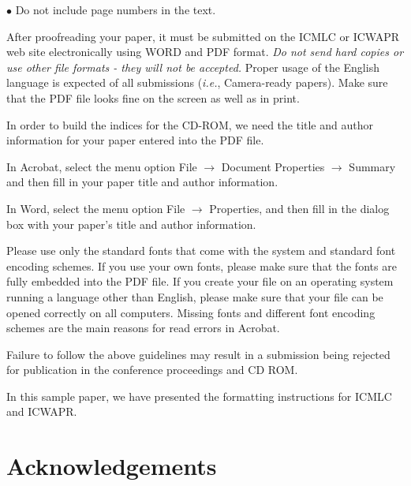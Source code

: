 \documentclass[a4paper, times, 10pt,twocolumn]{article}
\begin{document}
 \hspace{-3ex}    $\bullet$ \hspace{1ex} Do not include page numbers in the text.



After proofreading your paper, it must be submitted on the ICMLC or ICWAPR web site electronically using WORD and PDF format.
{\it Do not send hard copies or use other file formats - they will
not be accepted.} Proper usage of the English language is expected
of all submissions (\textit{i.e.}, Camera-ready papers). Make sure that the
PDF file looks fine on the screen as well as in print.

In order to build the indices for the CD-ROM, we need the title and
author information for your paper entered into the PDF file.

In Acrobat, select the menu option File $\longrightarrow$ Document
Properties $\longrightarrow$ Summary and then fill in your paper
title and author information.

In Word, select the menu option File $\longrightarrow$ Properties,
and then fill in the dialog box with your paper's title and author
information.

Please use only the standard fonts that come with the system and
standard font encoding schemes. If you use your own fonts, please
make sure that the fonts are fully embedded into the PDF file. If
you create your file on an operating system running a language other
than English, please make sure that your file can be opened
correctly on all computers. Missing fonts and different font
encoding schemes are the main reasons for read errors in Acrobat.

Failure to follow the above guidelines may result in a submission
being rejected for publication in the conference proceedings and CD
ROM.

\newpage

In this sample paper, we have presented the formatting instructions
for ICMLC and ICWAPR.



\section*{Acknowledgements}
\end{document}

